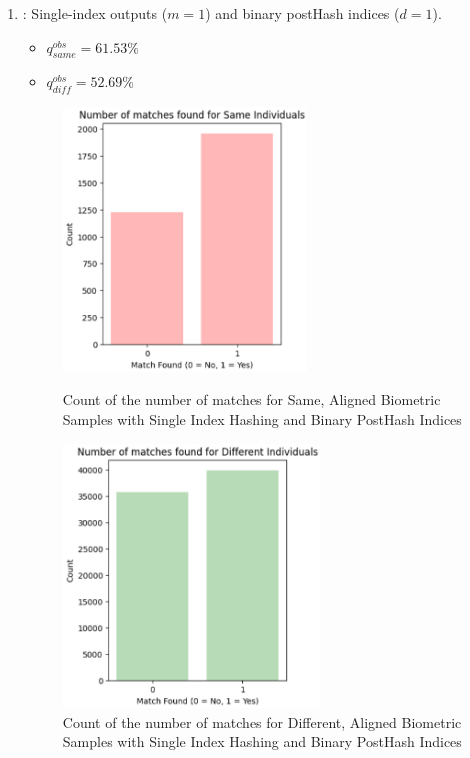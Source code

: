 \begin{enumerate}
    \item {}: Single-index outputs (\(m=1\)) and binary postHash indices (\(d=1\)).
    \begin{itemize}
        \item \(q_{same}^{obs} = 61.53\%\)
        \item \(q_{diff}^{obs} = 52.69\%\)
    \end{itemize}

    \begin{figure}[H]
        \centering
        \begin{minipage}[b]{0.48\linewidth}
            \centering
            \includegraphics[width=\linewidth,height=7cm,keepaspectratio]{latex-img/d1same.png}
            \caption{Count of the number of matches for Same, Aligned Biometric Samples with Single Index Hashing and Binary PostHash Indices}
            \label{mu_same}
        \end{minipage}
        \hfill
        \begin{minipage}[b]{0.48\linewidth}
            \centering
            \includegraphics[width=\linewidth,height=7cm,keepaspectratio]{latex-img/d1diff.png}
            \caption{Count of the number of matches for Different, Aligned Biometric Samples with Single Index Hashing and Binary PostHash Indices}
            \label{mu_diff}
        \end{minipage}
    \end{figure}
    

\end{enumerate}
